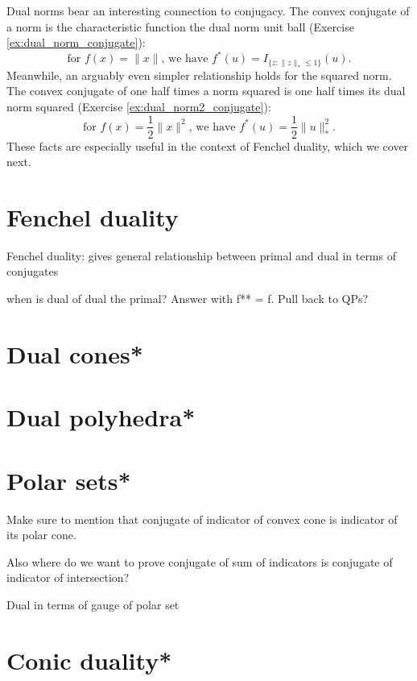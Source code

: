 Dual norms bear an interesting connection to conjugacy. The convex conjugate of
a norm is the characteristic function the dual norm unit ball (Exercise 
\ref{ex:dual_norm_conjugate}): 
\begin{equation}
\label{eq:dual_norm_conjugate}
\text{for $f(x) = \|x\|$, we have $f^*(u) = I_{\{z : \|z\|_* \leq 1\}}(u)$}.
\end{equation}
Meanwhile, an arguably even simpler relationship holds for the squared
norm. The convex conjugate of one half times a norm squared is one half times 
its dual norm squared (Exercise \ref{ex:dual_norm2_conjugate}):    
\begin{equation}
\label{eq:dual_norm2_conjugate}
\text{for $f(x) = \frac{1}{2} \|x\|^2$, we have $f^*(u) = \frac{1}{2}
  \|u\|_*^2$}. 
\end{equation}
These facts are especially useful in the context of Fenchel duality, which we
cover next.  

\section{Fenchel duality}

Fenchel duality: gives general relationship between primal and dual in terms of
conjugates 

when is dual of dual the primal? Answer with f** = f. Pull back to QPs? 

\section{Dual cones*}
\label{sec:dual_cones}

\section{Dual polyhedra*}
\label{sec:dual_polyhedra}

\section{Polar sets*}
\label{sec:polar_sets}

Make sure to mention that conjugate of indicator of convex cone is indicator of
its polar cone. 

Also where do we want to prove conjugate of sum of indicators is conjugate of
indicator of intersection?

Dual in terms of gauge of polar set 

\section{Conic duality*}
\label{sec:conic_duality}

